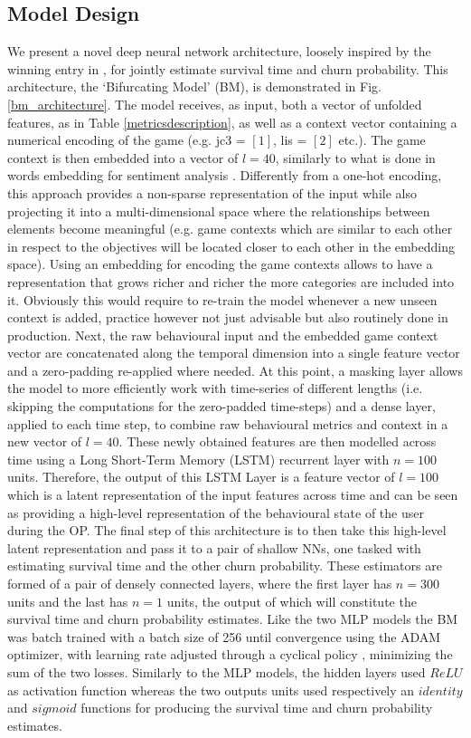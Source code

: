 \subsection{Model Design}
We present a novel deep neural network architecture, loosely inspired by the winning entry in \cite{lee2018game}, for jointly estimate survival time and churn probability. This architecture, the `Bifurcating Model' (BM), is demonstrated in Fig. \ref{bm_architecture}. The model receives, as input, both a vector of unfolded features, as in Table \ref{metricsdescription}, as well as a context vector containing a numerical encoding of the game (e.g. jc3 = $[1]$, lis = $[2]$ etc.). The game context is then embedded into a vector of $l = 40$, similarly to what is done in words embedding for sentiment analysis \cite{chollet2015keras}. Differently from a one-hot encoding, this approach provides a non-sparse representation of the input while also projecting it into a multi-dimensional space where the relationships between elements become meaningful (e.g. game contexts which are similar to each other in respect to the objectives will be located closer to each other in the embedding space). Using an embedding for encoding the game contexts allows to have a representation that grows richer and richer the more categories are included into it. Obviously this would require to re-train the model whenever a new unseen context is added, practice however not just advisable but also routinely done in production. Next, the raw behavioural input and the embedded game context vector are concatenated along the temporal dimension into a single feature vector and a zero-padding re-applied where needed. At this point, a masking layer allows the model to more efficiently work with time-series of different lengths (i.e. skipping the computations for the zero-padded time-steps) and a dense layer, applied to each time step, to combine raw behavioural metrics and context in a new vector of $l = 40$. These newly obtained features are then modelled across time using a Long Short-Term Memory (LSTM) recurrent layer with $n = 100$ units. Therefore, the output of this LSTM Layer is a feature vector of $l = 100$ which is a latent representation of the input features across time and can be seen as providing a high-level representation of the behavioural state of the user during the OP. The final step of this architecture is to then take this high-level latent representation and pass it to a pair of shallow NNs, one tasked with estimating survival time and the other churn probability. These estimators are formed of a pair of densely connected layers, where the first layer has $n = 300$ units and the last has $n = 1$ units, the output of which will constitute the survival time and churn probability estimates. Like the two MLP models the BM was batch trained with a batch size of 256 until convergence using the ADAM optimizer, with learning rate adjusted through a cyclical policy \cite{smith2017cyclical, chollet2015keras}, minimizing the sum of the two losses. Similarly to the MLP models, the hidden layers used $ReLU$ as activation function whereas the two outputs units used respectively an $identity$ and $sigmoid$ functions for producing the survival time and churn probability estimates. 